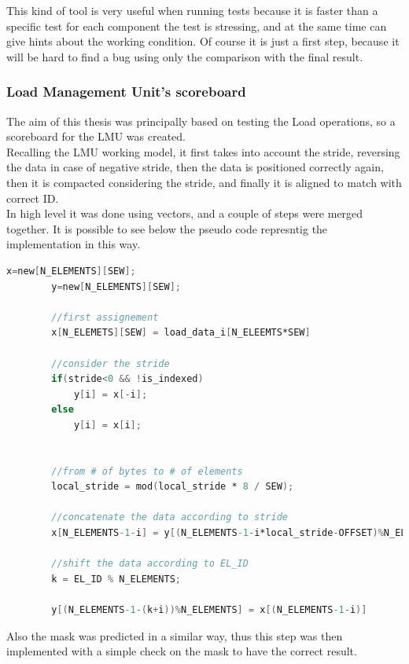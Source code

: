 This kind of tool is very useful when running tests because it is faster than a specific test for each component the test is stressing, and at the same time can give hints about the working condition. Of course it is just a first step, because it will be hard to find a bug using only the comparison with the final result.\\

\subsubsection{Load Management Unit's scoreboard}
The aim of this thesis was principally based on testing the Load operations, so a scoreboard for the LMU was created.\\

Recalling the LMU working model, it first takes into account the stride, reversing the data in case of negative stride, then the data is positioned correctly again, then it is compacted considering the stride, and finally it is aligned to match with correct ID.\\

In high level it was done using vectors, and a couple of steps were merged together. It is possible to see below the pseudo code represntig the implementation in this way.

\begin{lstlisting}[language=Verilog,style=verilog-style, backgroundcolor=\color{lyel_palette}, frame=tlb]
        x=new[N_ELEMENTS][SEW];
        y=new[N_ELEMENTS][SEW];

        //first assignement
        x[N_ELEMETS][SEW] = load_data_i[N_ELEEMTS*SEW]

        //consider the stride
        if(stride<0 && !is_indexed)
            y[i] = x[-i];
        else
            y[i] = x[i];
        

        //from # of bytes to # of elements
        local_stride = mod(local_stride * 8 / SEW);

        //concatenate the data according to stride 
        x[N_ELEMENTS-1-i] = y[(N_ELEMENTS-1-i*local_stride-OFFSET)%N_ELEMENTS];

        //shift the data according to EL_ID
        k = EL_ID % N_ELEMENTS;
        
        y[(N_ELEMENTS-1-(k+i))%N_ELEMENTS] = x[(N_ELEMENTS-1-i)]
\end{lstlisting}

Also the mask was predicted in a similar way, thus this step was then implemented with a simple check on the mask to have the correct result.\\

